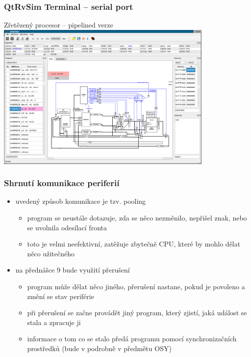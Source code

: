 \documentclass{beamer}
\begin{document}
\begin{frame}
\frametitle{QtRvSim Terminal -- serial port}
\begin{center}
Zřetězený procesor -- pipelined verze
\includegraphics[width=0.8\textwidth]{fig/QtRvSim-serial-normal.png}
\end{center}
\end{frame}

\begin{frame}
\frametitle{Shrnutí komunikace periferií}

\begin{itemize}
\item uvedený způsob komunikace je tzv. pooling
\begin{itemize}
\item program se neustále dotazuje, zda se něco nezměnilo, nepřišel znak, nebo se uvolnila odesílací fronta
\item toto je velmi neefektivní, zatěžuje zbytečně CPU, které by mohlo dělat něco užitečného
\end{itemize}
\item na přednášce 9 bude využití přerušení
\begin{itemize}
\item program může dělat něco jiného, přerušení nastane, pokud je povoleno a změní se stav periférie
\item při přerušení se začne provádět jiný program, který zjistí, jaká událost se stala a zpracuje ji
\item informace o tom co se stalo předá programu pomocí synchronizačních prostředků (bude v podrobně v předmětu OSY)
\end{itemize}
\end{itemize}

\end{frame}
\end{document}

